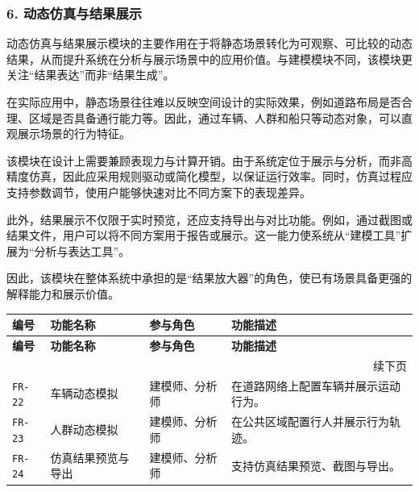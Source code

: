 \documentclass[UTF8,a4paper,10pt]{ctexart}
\begin{document}
\subsubsection*{6. 动态仿真与结果展示}
动态仿真与结果展示模块的主要作用在于将静态场景转化为可观察、可比较的动态结果，从而提升系统在分析与展示场景中的应用价值。与建模模块不同，该模块更关注“结果表达”而非“结果生成”。

在实际应用中，静态场景往往难以反映空间设计的实际效果，例如道路布局是否合理、区域是否具备通行能力等。因此，通过车辆、人群和船只等动态对象，可以直观展示场景的行为特征。

该模块在设计上需要兼顾表现力与计算开销。由于系统定位于展示与分析，而非高精度仿真，因此应采用规则驱动或简化模型，以保证运行效率。同时，仿真过程应支持参数调节，使用户能够快速对比不同方案下的表现差异。

此外，结果展示不仅限于实时预览，还应支持导出与对比功能。例如，通过截图或结果文件，用户可以将不同方案用于报告或展示。这一能力使系统从“建模工具”扩展为“分析与表达工具”。

因此，该模块在整体系统中承担的是“结果放大器”的角色，使已有场景具备更强的解释能力和展示价值。
{
\renewcommand{\arraystretch}{1.35}

\begin{longtable}{p{1.8cm} p{2.6cm} p{2.2cm} p{6.2cm}}
\toprule
\rowcolor{gray!20}
\textbf{编号} & \textbf{功能名称} & \textbf{参与角色} & \textbf{功能描述} \\
\midrule
\endfirsthead

\toprule
\rowcolor{gray!20}
\textbf{编号} & \textbf{功能名称} & \textbf{参与角色} & \textbf{功能描述} \\
\midrule
\endhead

\midrule
\multicolumn{4}{r}{\small 续下页}\\
\endfoot

\bottomrule
\endlastfoot

\texttt{FR-22} & 车辆动态模拟 & 建模师、分析师 & 在道路网络上配置车辆并展示运动行为。 \\
\texttt{FR-23} & 人群动态模拟 & 建模师、分析师 & 在公共区域配置行人并展示行为轨迹。 \\
\texttt{FR-24} & 仿真结果预览与导出 & 建模师、分析师 & 支持仿真结果预览、截图与导出。 \\

\end{longtable}
}
\end{document}
